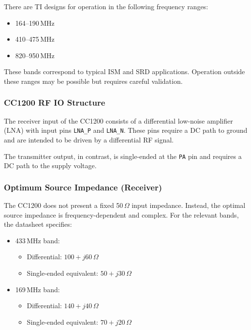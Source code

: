 There are TI designs for operation in the following frequency ranges:

\begin{itemize}
    \item 164--190\,MHz
    \item 410--475\,MHz
    \item 820--950\,MHz
\end{itemize}

These bands correspond to typical ISM and SRD applications. Operation outside these ranges may be possible but requires careful validation. \cite{cc1200_datasheet}

\subsubsection{CC1200 RF IO Structure}

The receiver input of the CC1200 consists of a differential low-noise amplifier (LNA) with input pins \texttt{LNA\_P} and \texttt{LNA\_N}. These pins require a DC path to ground and are intended to be driven by a differential RF signal. \cite{cc1200_datasheet}

The transmitter output, in contrast, is single-ended at the \texttt{PA} pin and requires a DC path to the supply voltage.

\subsubsection{Optimum Source Impedance (Receiver)}

The CC1200 does not present a fixed 50\,$\Omega$ input impedance. Instead, the optimal source impedance is frequency-dependent and complex. For the relevant bands, the datasheet specifies:

\begin{itemize}
    \item 433\,MHz band: 
    \begin{itemize}
        \item Differential: $100 + j60\,\Omega$
        \item Single-ended equivalent: $50 + j30\,\Omega$
    \end{itemize}
    \item 169\,MHz band:
    \begin{itemize}
        \item Differential: $140 + j40\,\Omega$
        \item Single-ended equivalent: $70 + j20\,\Omega$
    \end{itemize}
\end{itemize}

